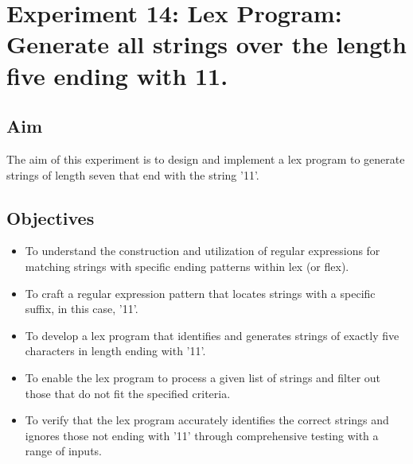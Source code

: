 \documentclass[12pt]{article}
\begin{document}
\newpage
\section*{Experiment 14: Lex Program: Generate all strings over the length five ending with 11.}

\subsection*{Aim}
The aim of this experiment is to design and implement a lex program to generate strings of length seven that end with the string '11'.

\subsection*{Objectives}
\begin{itemize}
    \item To understand the construction and utilization of regular expressions for matching strings with specific ending patterns within lex (or flex).
    \item To craft a regular expression pattern that locates strings with a specific suffix, in this case, '11'.
    \item To develop a lex program that identifies and generates strings of exactly five characters in length ending with '11'.
    \item To enable the lex program to process a given list of strings and filter out those that do not fit the specified criteria.
    \item To verify that the lex program accurately identifies the correct strings and ignores those not ending with '11' through comprehensive testing with a range of inputs.
\end{itemize}
\end{document}

